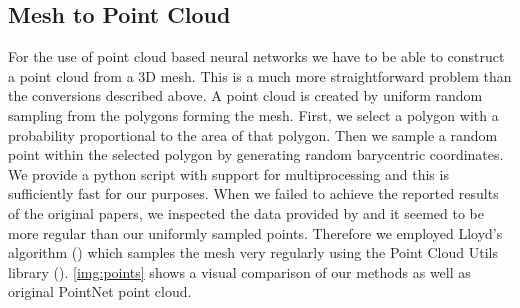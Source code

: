 \subsection{Mesh to Point Cloud}
\label{subsec:pointcloud}
For the use of point cloud based neural networks we have to be able to construct a point cloud from a 3D mesh. This is a much more straightforward problem than the conversions described above. A point cloud is created by uniform random sampling from the polygons forming the mesh. First, we select a polygon with a probability proportional to the area of that polygon. Then we sample a random point within the selected polygon by generating random barycentric coordinates. We provide a python script with support for multiprocessing and this is sufficiently fast for our purposes. When we failed to achieve the reported results of the original papers, we inspected the data provided by \cite{qi_pointnet_2016} and it seemed to be more regular than our uniformly sampled points. Therefore we employed Lloyd's algorithm (\cite{lloyd_least_1982}) which samples the mesh very regularly using the Point Cloud Utils library (\cite{williams_point_2019}). \autoref{img:points} shows a visual comparison of our methods as well as original PointNet point cloud.

